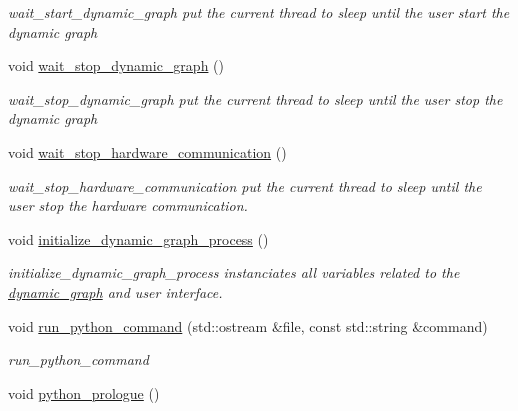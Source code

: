 \begin{DoxyCompactItemize}
\begin{DoxyCompactList}\small\item\em wait\+\_\+start\+\_\+dynamic\+\_\+graph put the current thread to sleep until the user start the dynamic graph \end{DoxyCompactList}\item 
void \hyperlink{classdynamic__graph_1_1DynamicGraphManager_ab827a776b4ac31ea91ace9a2bfc1e99d}{wait\+\_\+stop\+\_\+dynamic\+\_\+graph} ()\hypertarget{classdynamic__graph_1_1DynamicGraphManager_ab827a776b4ac31ea91ace9a2bfc1e99d}{}\label{classdynamic__graph_1_1DynamicGraphManager_ab827a776b4ac31ea91ace9a2bfc1e99d}

\begin{DoxyCompactList}\small\item\em wait\+\_\+stop\+\_\+dynamic\+\_\+graph put the current thread to sleep until the user stop the dynamic graph \end{DoxyCompactList}\item 
void \hyperlink{classdynamic__graph_1_1DynamicGraphManager_a83a98e169cd587d101bba69bb799e408}{wait\+\_\+stop\+\_\+hardware\+\_\+communication} ()
\begin{DoxyCompactList}\small\item\em wait\+\_\+stop\+\_\+hardware\+\_\+communication put the current thread to sleep until the user stop the hardware communication. \end{DoxyCompactList}\item 
void \hyperlink{classdynamic__graph_1_1DynamicGraphManager_a81926d5d33573d667bc6511bbb2d8f52}{initialize\+\_\+dynamic\+\_\+graph\+\_\+process} ()\hypertarget{classdynamic__graph_1_1DynamicGraphManager_a81926d5d33573d667bc6511bbb2d8f52}{}\label{classdynamic__graph_1_1DynamicGraphManager_a81926d5d33573d667bc6511bbb2d8f52}

\begin{DoxyCompactList}\small\item\em initialize\+\_\+dynamic\+\_\+graph\+\_\+process instanciates all variables related to the \hyperlink{namespacedynamic__graph}{dynamic\+\_\+graph} and user interface. \end{DoxyCompactList}\item 
void \hyperlink{classdynamic__graph_1_1DynamicGraphManager_a56acce72235fe0786830ec19a3439309}{run\+\_\+python\+\_\+command} (std\+::ostream \&file, const std\+::string \&command)
\begin{DoxyCompactList}\small\item\em run\+\_\+python\+\_\+command \end{DoxyCompactList}\item 
void \hyperlink{classdynamic__graph_1_1DynamicGraphManager_a11cc3b7fefc7fe146dc112a7e6d55f3d}{python\+\_\+prologue} ()\hypertarget{classdynamic__graph_1_1DynamicGraphManager_a11cc3b7fefc7fe146dc112a7e6d55f3d}{}\label{classdynamic__graph_1_1DynamicGraphManager_a11cc3b7fefc7fe146dc112a7e6d55f3d}


\end{DoxyCompactItemize}
